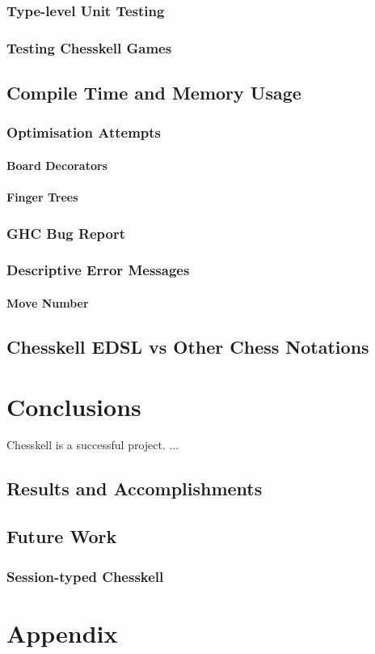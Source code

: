 \documentclass[12pt, a4paper, bibliography=totocnumbered]{scrreprt}
\begin{document}
\subsection{Type-level Unit Testing}

\subsection{Testing Chesskell Games}

\section{Compile Time and Memory Usage}

\subsection{Optimisation Attempts}

\subsubsection{Board Decorators}

\subsubsection{Finger Trees}

\subsection{GHC Bug Report}

\subsection{Descriptive Error Messages}

\subsubsection{Move Number}

\section{Chesskell EDSL vs Other Chess Notations}


\chapter{Conclusions}

Chesskell is a successful project. ...

\section{Results and Accomplishments}

\section{Future Work}

\subsection{Session-typed Chesskell}





\chapter{Appendix}
\end{document}
